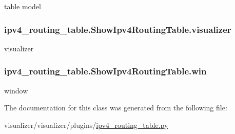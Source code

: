 table model 

\subsubsection[{\texorpdfstring{visualizer}{visualizer}}]{\setlength{\rightskip}{0pt plus 5cm}ipv4\+\_\+routing\+\_\+table.\+Show\+Ipv4\+Routing\+Table.\+visualizer}\hypertarget{classipv4__routing__table_1_1ShowIpv4RoutingTable_aaffe658fdd5746d8db628aae110374fc}{}\label{classipv4__routing__table_1_1ShowIpv4RoutingTable_aaffe658fdd5746d8db628aae110374fc}


visualizer 

\subsubsection[{\texorpdfstring{win}{win}}]{\setlength{\rightskip}{0pt plus 5cm}ipv4\+\_\+routing\+\_\+table.\+Show\+Ipv4\+Routing\+Table.\+win}\hypertarget{classipv4__routing__table_1_1ShowIpv4RoutingTable_aef66404f7aed5614e7b2444d7a28f010}{}\label{classipv4__routing__table_1_1ShowIpv4RoutingTable_aef66404f7aed5614e7b2444d7a28f010}


window 



The documentation for this class was generated from the following file\+:\begin{DoxyCompactItemize}
\item 
visualizer/visualizer/plugins/\hyperlink{ipv4__routing__table_8py}{ipv4\+\_\+routing\+\_\+table.\+py}\end{DoxyCompactItemize}
